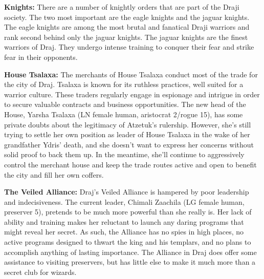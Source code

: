 {
	\textbf{Knights:} There are a number of knightly orders that are part of the Draji society. The two most important are the eagle knights and the jaguar knights. The eagle knights are among the most brutal and fanatical Draji warriors and rank second behind only the jaguar knights. The jaguar knights are the finest warriors of Draj. They undergo intense training to conquer their fear and strike fear in their opponents.

	\textbf{House Tsalaxa:} The merchants of House Tsalaxa conduct most of the trade for the city of Draj. Tsalaxa is known for its ruthless practices, well suited for a warrior culture. These traders regularly engage in espionage and intrigue in order to secure valuable contracts and business opportunities. The new head of the House, Yarsha Tsalaxa (LN female human, aristocrat 2/rogue 15), has some private doubts about the legitimacy of Atzetuk's rulership. However, she's still trying to settle her own position as leader of House Tsalaxa in the wake of her grandfather Ydris' death, and she doesn't want to express her concerns without solid proof to back them up. In the meantime, she'll continue to aggressively control the merchant house and keep the trade routes active and open to benefit the city and fill her own coffers.

	\textbf{The Veiled Alliance:} Draj's Veiled Alliance is hampered by poor leadership and indecisiveness. The current leader, Chimali Zaachila (LG female human, preserver 5), pretends to be much more powerful than she really is. Her lack of ability and training makes her reluctant to launch any daring programs that might reveal her secret. As such, the Alliance has no spies in high places, no active programs designed to thwart the king and his templars, and no plans to accomplish anything of lasting importance. The Alliance in Draj does offer some assistance to visiting preservers, but has little else to make it much more than a secret club for wizards.
}
